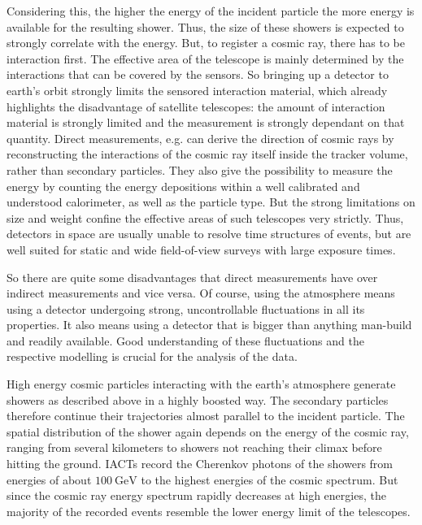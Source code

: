 Considering this, the higher the energy of the incident particle the more
energy is available for the resulting shower. Thus, the size of these showers
is expected to strongly correlate with the energy. But, to register a cosmic
ray, there has to be interaction first. The effective area of the telescope
is mainly determined by the interactions that can be covered by the sensors. So
bringing up a detector to earth's orbit strongly limits the sensored
interaction material, which already highlights the disadvantage of satellite
telescopes: the amount of interaction material is strongly limited and the
measurement is strongly dependant on that quantity. Direct measurements, e.g.
can derive the direction of cosmic rays by reconstructing the interactions of
the cosmic ray itself inside the tracker volume, rather than secondary
particles. They also give the possibility to measure the energy by counting the
energy depositions within a well calibrated and understood calorimeter, as well
as the particle type. But the strong limitations on size and weight confine the
effective areas of such telescopes very strictly. Thus, detectors in space are
usually unable to resolve time structures of events, but are well suited for
static and wide field-of-view surveys with large exposure times.

So there are quite some disadvantages that direct measurements have over
indirect measurements and vice versa. Of course, using the atmosphere means
using a detector undergoing strong, uncontrollable fluctuations in all its
properties. It also means using a detector that is bigger than anything
man-build and readily available. Good understanding of these fluctuations and
the respective modelling is crucial for the analysis of the data.

High energy cosmic particles interacting with the earth's atmosphere generate
showers as described above in a highly boosted way. The secondary particles
therefore continue their trajectories almost parallel to the incident particle.
The spatial distribution of the shower again depends on the energy of the
cosmic ray, ranging from several kilometers to showers not reaching their
climax before hitting the ground. IACTs record the Cherenkov photons of the
showers from energies of about $\SI{100}{\giga\electronvolt}$ to the highest
energies of the cosmic spectrum. But since the cosmic ray energy spectrum
rapidly decreases at high energies, the majority of the recorded events
resemble the lower energy limit of the telescopes.
